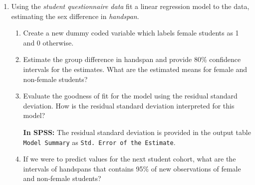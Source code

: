 \documentclass[a4paper, fleqn]{article}
\begin{document}
\begin{enumerate}
  \vspace{1em}
  \item Using the \textit{student questionnaire data} fit a linear regression model to the data, estimating the sex difference in \textit{handspan}.
  \begin{enumerate}
    \item Create a new dummy coded variable which labels female students as 1 and 0 otherwise. 
    \item Estimate the group difference in handspan and provide 80\% confidence intervals for the estimates. What are the estimated means for female and non-female students? 
    \item Evaluate the goodness of fit for the model using the residual standard deviation. How is the residual standard deviation interpreted for this model? 

    \vspace{0.5em}
    \textbf{In SPSS:} The residual standard deviation is provided in the output table \texttt{Model Summary} as \texttt{Std. Error of the Estimate}.  

    \item If we were to predict values for the next student cohort, what are the intervals of handspans that contains 95\% of new observations of female and non-female students? 
  \end{enumerate}

\end{enumerate}
\end{document}
